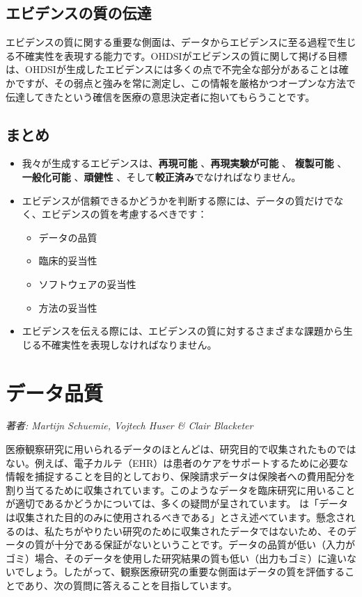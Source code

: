 \documentclass[
  11pt]{book}
\makeatletter
\providecommand{\tightlist}{%
  \setlength{\itemsep}{0pt}\setlength{\parskip}{0pt}}
\newenvironment{kframe}{%
\medskip{}
\setlength{\fboxsep}{.8em}
 \def\at@end@of@kframe{}%
 \ifinner\ifhmode%
  \def\at@end@of@kframe{\end{minipage}}%
  \begin{minipage}{\columnwidth}%
 \fi\fi%
 \def\FrameCommand##1{\hskip\@totalleftmargin \hskip-\fboxsep
 \colorbox{myShadeColor}{##1}\hskip-\fboxsep
     \hskip-\linewidth \hskip-\@totalleftmargin \hskip\columnwidth}%
 \MakeFramed {\advance\hsize-\width
   \@totalleftmargin\z@ \linewidth\hsize
   \@setminipage}}%
 {\par\unskip\endMakeFramed%
 \at@end@of@kframe}
\newenvironment{rmdblock}[1]
  {
  \begin{itemize}
  \renewcommand{\labelitemi}{
    \raisebox{-.7\height}[0pt][0pt]{
      {\setkeys{Gin}{width=3em,keepaspectratio}\texttt{[image: images/\#1]}}
    }
  }
  \setlength{\fboxsep}{1em}
  \begin{kframe}
  \item
  }
  {
  \end{kframe}
  \end{itemize}
  }
\newenvironment{rmdsummary}
  {\begin{rmdblock}{summary}}
  {\end{rmdblock}}
\theoremstyle{definition}
\theoremstyle{definition}
\theoremstyle{definition}
\theoremstyle{definition}
\theoremstyle{remark}
\makeatother
\begin{document}
\section{エビデンスの質の伝達}\label{ux30a8ux30d3ux30c7ux30f3ux30b9ux306eux8ceaux306eux4f1dux9054}

エビデンスの質に関する重要な側面は、データからエビデンスに至る過程で生じる不確実性を表現する能力です。OHDSIがエビデンスの質に関して掲げる目標は、OHDSIが生成したエビデンスには多くの点で不完全な部分があることは確かですが、その弱点と強みを常に測定し、この情報を厳格かつオープンな方法で伝達してきたという確信を医療の意思決定者に抱いてもらうことです。

\section{まとめ}\label{ux307eux3068ux3081-11}

\begin{rmdsummary}
\begin{itemize}
\item
  我々が生成するエビデンスは、\textbf{再現可能} 、\textbf{再現実験が可能} 、 \textbf{複製可能} 、\textbf{一般化可能} 、\textbf{頑健性} 、そして\textbf{較正済み}でなければなりません。
\item
  エビデンスが信頼できるかどうかを判断する際には、データの質だけでなく、エビデンスの質を考慮するべきです：

  \begin{itemize}
  \tightlist
  \item
    データの品質
  \item
    臨床的妥当性
  \item
    ソフトウェアの妥当性
  \item
    方法の妥当性
  \end{itemize}
\item
  エビデンスを伝える際には、エビデンスの質に対するさまざまな課題から生じる不確実性を表現しなければなりません。
\end{itemize}
\end{rmdsummary}

\chapter{データ品質}\label{DataQuality}

\emph{著者: Martijn Schuemie, Vojtech Huser \& Clair Blacketer}

医療観察研究に用いられるデータのほとんどは、研究目的で収集されたものではない。例えば、電子カルテ（EHR）は患者のケアをサポートするために必要な情報を捕捉することを目的としており、保険請求データは保険者への費用配分を割り当てるために収集されています。このようなデータを臨床研究に用いることが適切であるかどうかについては、多くの疑問が呈されています。\citet{vanDerLei_1991} は「データは収集された目的のみに使用されるべきである」とさえ述べています。懸念されるのは、私たちがやりたい研究のために収集されたデータではないため、そのデータの質が十分である保証がないということです。データの品質が低い（入力がゴミ）場合、そのデータを使用した研究結果の質も低い（出力もゴミ）に違いないでしょう。したがって、観察医療研究の重要な側面はデータの質を評価することであり、次の質問に答えることを目指しています。
\end{document}
